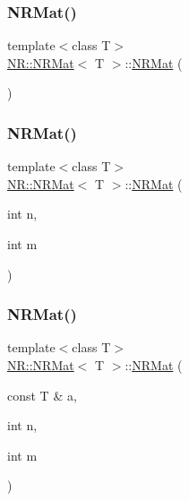 \mbox{\label{classNR_1_1NRMat_abcaca2687429fc0f26cde34647f7c981}} 
\subsubsection{\texorpdfstring{NRMat()}{NRMat()}\hspace{0.1cm}{\footnotesize\ttfamily [6/10]}}
{\footnotesize\ttfamily template$<$class T$>$ \\
\mbox{\hyperlink{classNR_1_1NRMat}{N\+R\+::\+N\+R\+Mat}}$<$ T $>$\+::\mbox{\hyperlink{classNR_1_1NRMat}{N\+R\+Mat}} (\begin{DoxyParamCaption}{ }\end{DoxyParamCaption})}

\mbox{\label{classNR_1_1NRMat_a52799868d76fb74a2d73b8d8291a9215}} 
\subsubsection{\texorpdfstring{NRMat()}{NRMat()}\hspace{0.1cm}{\footnotesize\ttfamily [7/10]}}
{\footnotesize\ttfamily template$<$class T$>$ \\
\mbox{\hyperlink{classNR_1_1NRMat}{N\+R\+::\+N\+R\+Mat}}$<$ T $>$\+::\mbox{\hyperlink{classNR_1_1NRMat}{N\+R\+Mat}} (\begin{DoxyParamCaption}\item[{int}]{n,  }\item[{int}]{m }\end{DoxyParamCaption})}

\mbox{\label{classNR_1_1NRMat_a31a0ecf81920c576b25e3c49bfa5e444}} 
\subsubsection{\texorpdfstring{NRMat()}{NRMat()}\hspace{0.1cm}{\footnotesize\ttfamily [8/10]}}
{\footnotesize\ttfamily template$<$class T$>$ \\
\mbox{\hyperlink{classNR_1_1NRMat}{N\+R\+::\+N\+R\+Mat}}$<$ T $>$\+::\mbox{\hyperlink{classNR_1_1NRMat}{N\+R\+Mat}} (\begin{DoxyParamCaption}\item[{const T \&}]{a,  }\item[{int}]{n,  }\item[{int}]{m }\end{DoxyParamCaption})}

